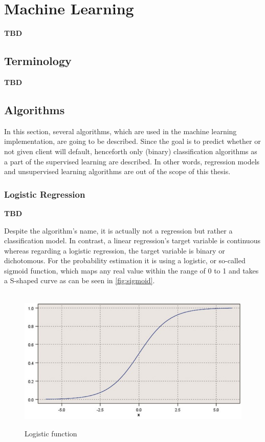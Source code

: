 \chapter{Machine Learning}
\label{chap:three}



\textbf{TBD}

\section{Terminology}

\textbf{TBD}
\section{Algorithms}

In this section, several algorithms, which are used in the machine learning implementation, are going to be described. Since the goal is to predict whether or not given client will default, henceforth only (binary) classification algorithms as a part of the supervised learning are described. In other words, regression models and unsupervised learning algorithms are out of the scope of this thesis.
\subsection{Logistic Regression}

\textbf{TBD}

Despite the algorithm's name, it is actually not a regression but rather a classification model.
In contrast, a linear regression's target variable is continuous whereas regarding a logistic regression, the target variable is binary or dichotomous.
For the probability estimation it is using a logistic, or so-called sigmoid function, which maps any real value within the range of 0 to 1 and takes a S-shaped curve as can be seen in \autoref{fig:sigmoid}.

\begin{figure}[H]
    \centering
    \caption{Logistic function}\vspace{0.5em}
    \label{fig:sigmoid}\
    \includegraphics[width=130mm]{Figures/sigmoid.jpg}
    \vspace{-1em}
\end{figure}

